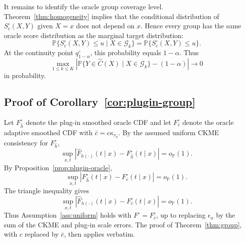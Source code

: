 \documentclass[11pt]{article}
\newcommand{\Gcal}{\mathcal G}
\newcommand{\Pp}{\mathbb P}
\newcommand{\abs}[1]{\left\lvert #1 \right\rvert}
\newcommand{\op}{o_{\mathbb P}}
\begin{document}
It remains to identify the oracle group coverage level. Theorem~\ref{thm:homogeneity} implies that the conditional distribution of \(S_c^\circ(X,Y)\) given \(X=x\) does not depend on \(x\). Hence every group has the same oracle score distribution as the marginal target distribution:
\[
  \Pp\{S_c^\circ(X,Y)\le u\mid X\in\Gcal_k\}
  =
  \Pp\{S_c^\circ(X,Y)\le u\}.
\]
At the continuity point \(q^\circ_{1-\alpha}\), this probability equals \(1-\alpha\). Thus
\[
  \max_{1\le k\le K}
  \abs{
  \Pp\{Y\in\widehat C(X)\mid X\in\Gcal_k\}
  -(1-\alpha)
  }
  \to 0
\]
in probability.

\subsection{Proof of Corollary~\ref{cor:plugin-group}}

Let \(F_{\widehat h}^{\circ}\) denote the plug-in smoothed oracle CDF and let \(F_{\bar c}^\circ\) denote the oracle adaptive smoothed CDF with \(\bar c=c\kappa_{r_0}\). By the assumed uniform CKME consistency for \(F_{\widehat h}^{\circ}\),
\[
  \sup_{x,t}
  \abs{\widehat F_{h(\cdot)}(t\mid x)-F_{\widehat h}^{\circ}(t\mid x)}
  =
  \op(1).
\]
By Proposition~\ref{prop:plugin-oracle},
\[
  \sup_{x,t}
  \abs{F_{\widehat h}^{\circ}(t\mid x)-F_{\bar c}^\circ(t\mid x)}
  =
  \op(1).
\]
The triangle inequality gives
\[
  \sup_{x,t}
  \abs{\widehat F_{h(\cdot)}(t\mid x)-F_{\bar c}^\circ(t\mid x)}
  =
  \op(1).
\]
Thus Assumption~\ref{ass:uniform} holds with \(F^\circ=F_{\bar c}^\circ\), up to replacing \(\epsilon_n\) by the sum of the CKME and plug-in scale errors. The proof of Theorem~\ref{thm:group}, with \(c\) replaced by \(\bar c\), then applies verbatim.
\end{document}
